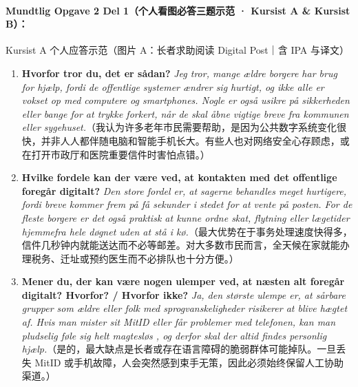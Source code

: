 \clearpage
\paragraph*{Mundtlig Opgave 2 Del 1（个人看图必答三题示范 · Kursist A \& Kursist B）：}

\begin{grammatikbox}{Kursist A 个人应答示范（图片 A：长者求助阅读 Digital Post｜含 IPA 与译文）}
\small
\begin{enumerate}
  \item \textbf{Hvorfor tror du, det er sådan?} \textit{Jeg tror, mange ældre borgere har brug for hjælp, fordi de offentlige systemer ændrer sig hurtigt, og ikke alle er vokset op med computere og smartphones. Nogle er også usikre på sikkerheden  eller bange for at trykke forkert, når de skal åbne vigtige breve fra kommunen eller sygehuset.}（我认为许多老年市民需要帮助，是因为公共数字系统变化很快，并非人人都伴随电脑和智能手机长大。有些人也对网络安全心存顾虑，或在打开市政厅和医院重要信件时害怕点错。）
  \item \textbf{Hvilke fordele kan der være ved, at kontakten med det offentlige foregår digitalt?} \textit{Den store fordel er, at sagerne behandles  meget hurtigere, fordi breve kommer frem på få sekunder i stedet for at vente på posten. For de fleste borgere er det også praktisk at kunne ordne skat, flytning eller lægetider hjemmefra hele døgnet uden at stå i kø.}（最大优势在于事务处理速度快得多，信件几秒钟内就能送达而不必等邮差。对大多数市民而言，全天候在家就能办理税务、迁址或预约医生而不必排队也十分方便。）
  \item \textbf{Mener du, der kan være nogen ulemper ved, at næsten alt foregår digitalt? Hvorfor? / Hvorfor ikke?} \textit{Ja, den største ulempe er, at sårbare grupper som ældre eller folk med sprogvanskeligheder risikerer at blive hægtet af. Hvis man mister sit MitID eller får problemer med telefonen, kan man pludselig føle sig helt magtesløs , og derfor skal der altid findes personlig hjælp.}（是的，最大缺点是长者或存在语言障碍的脆弱群体可能掉队。一旦丢失 MitID 或手机故障，人会突然感到束手无策，因此必须始终保留人工协助渠道。）
\end{enumerate}
\end{grammatikbox}

